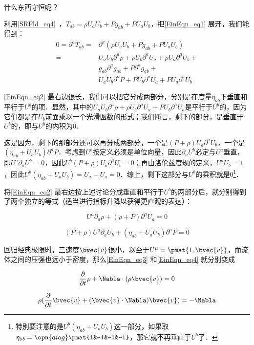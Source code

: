 什么东西守恒呢？

利用\autoref{SRFld_eq4}~，$T_{ab}=\rho U_aU_b+P g_{ab}+P U_aU_b$，把\autoref{EinEqn_eq1} 展开，我们能得到：
\begin{equation}\label{EinEqn_eq2}
\begin{aligned}
0=\partial^aT_{ab}=&\partial^a(\rho U_aU_b+P g_{ab}+P U_aU_b)\\
=&U_aU_b\partial^a\rho+\rho U_b\partial^aU_a+\rho U_a\partial^aU_b+\\
&g_{ab}\partial^ag_{ab}+P\partial^ag_{ab}+\\
&U_aU_b\partial^aP+P U_b\partial^aU_a+P U_a\partial^aU_b
\end{aligned}
\end{equation}

\autoref{EinEqn_eq2} 最右边很长，我们可以把它分成两部分，分别是在度量$\eta_{ab}$下垂直和平行于$U^b$的项．显然，其中的$U_aU_b\partial^a\rho+\rho U_b\partial^aU_a+P U_b\partial^aU_a$是平行于$U^b$的，因为它们都是在$U_b$前面乘以一个光滑函数的形式；我们断言，剩下的部分，是垂直于$U^b$的，即与$U^b$的内积为$0$．

这是因为，剩下的那部分还可以再分成两部分，一个是$(P+\rho)U_a\partial^aU_b$，一个是$(\eta_{ab}+U_aU_b)\partial^aP$．考虑到$U^b$按定义必须是单位向量，因此$\partial_aU^b$必定与$U^a$垂直，即$U^a\partial_aU^b=0$，因此$U^b(P+\rho)U_a\partial^aU_b=0$；再由洛伦兹度规的定义，$U^aU_b=1$，因此$U^b(\eta_{ab}+U_aU_b)=U_a-U_a=0$．综上，剩下这部分与$U^b$的乘积就是$0$\footnote{特别要注意的是$U^b(\eta_{ab}+U_aU_b)$这一部分，如果取$\eta_{ab}=\opn{diag}\pmat{1&-1&-1&-1}$，那它就不再垂直于$U^b$了．}．

将\autoref{EinEqn_eq2} 最右边按上述讨论分成垂直和平行于$U^b$的两部分后，就分别得到了两个独立的等式（适当进行指标升降以获得更直观的表达）：

\begin{equation}\label{EinEqn_eq3}
U^a\partial_a\rho+(\rho+P)\partial^aU_a=0
\end{equation}

\begin{equation}\label{EinEqn_eq4}
(P+\rho)U^a\partial_aU_b+(\eta_{ab}+U_aU_b)\partial^aP=0
\end{equation}

回归经典极限时，三速度$\bvec{v}$很小，以至于$U^\mu=\pmat{1, \bvec{v}}$，而流体之间的压强也远小于密度，那么\autoref{EinEqn_eq3} 和\autoref{EinEqn_eq4} 就分别变成

\begin{equation}\label{EinEqn_eq5}
\frac{\partial}{\partial t}\rho+\Nabla\cdot(\rho\bvec{v})=0
\end{equation}

\begin{equation}\label{EinEqn_eq6}
\rho(\frac{\partial}{\partial t}\bvec{v}+(\bvec{v}\cdot\Nabla)\bvec{v})=-\Nabla
\end{equation}











